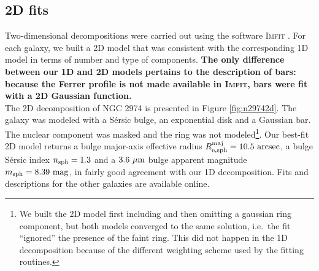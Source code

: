 \documentclass[preprint2]{emulateapj}
\begin{document}
\subsection{2D fits}
\label{sec:2d}
Two-dimensional decompositions were carried out using the software \textsc{Imfit} \citep{imfit}.
For each galaxy, we built a 2D model that was consistent with the corresponding 1D model in terms of number and type of components. 
{\bf The only difference between our 1D and 2D models pertains to the description of bars: 
because the Ferrer profile is not made available in \textsc{Imfit},
bars were fit with a 2D Gaussian function. } \\
The 2D decomposition of NGC 2974 is presented in Figure \ref{fig:n29742d}. 
The galaxy was modeled with a S\'ersic bulge, an exponential disk and a Gaussian bar.
The nuclear component was masked and the ring was not 
modeled\footnote{We built the 2D model first including and then omitting a gaussian ring component, 
but both models converged to the same solution, i.e.~the fit ``ignored'' the presence of the faint ring. 
This did not happen in the 1D decomposition because of the different weighting scheme used by the fitting routines.}. 
Our best-fit 2D model returns a bulge major-axis effective radius $R_{\rm e,sph}^{\rm maj} = 10.5~\rm arcsec$, 
a bulge S\'ersic index $n_{\rm sph} = 1.3$ and a $3.6~\rm \mu m$ bulge apparent magnitude $m_{\rm sph} = 8.39~\rm mag$, 
in fairly good agreement with our 1D decomposition. 
Fits and descriptions for the other galaxies are available online.
\end{document}
